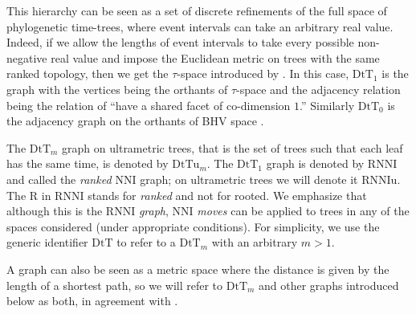 \documentclass[11pt]{amsart}
\theoremstyle{definition}
\newcommand{\nni}{\mathrm{NNI}}
\newcommand{\rnni}{\mathrm{RNNI}}
\newcommand{\rnniu}{\mathrm{RNNIu}}
\newcommand{\dtt}{\mathrm{DtT}}
\newcommand{\dttu}{\mathrm{DtTu}}
\begin{document}
This hierarchy can be seen as a set of discrete refinements of the full space of phylogenetic time-trees, where event intervals can take an arbitrary real value.
Indeed, if we allow the lengths of event intervals to take every possible non-negative real value and impose the Euclidean metric on trees with the same ranked topology, then we get the $\tau$-space introduced by \textcite{Gavryushkin2014-bw}.
In this case, $\dtt_1$ is the graph with the vertices being the orthants of $\tau$-space and the adjacency relation being the relation of ``have a shared facet of co-dimension $1$.''
Similarly $\dtt_0$ is the adjacency graph on the orthants of BHV space \autocite{Billera2001-rj}.

The $\dtt_m$ graph on ultrametric trees, that is the set of trees such that each leaf has the same time, is denoted by $\dttu_m$.
The $\dtt_1$ graph is denoted by $\rnni$ and called the \emph{ranked $\nni$} graph; on ultrametric trees we will denote it $\rnniu$.
The $\mathrm R$ in $\rnni$ stands for \emph{ranked} and not for rooted.
We emphasize that although this is the $\rnni$ \emph{graph}, $\nni$ \emph{moves} can be applied to trees in any of the spaces considered (under appropriate conditions).
For simplicity, we use the generic identifier $\dtt$ to refer to a $\dtt_m$ with an arbitrary $m > 1$.

A graph can also be seen as a metric space where the distance is given by the length of a shortest path, so we will refer to $\dtt_m$ and other graphs introduced below as both, in agreement with \autocite{Semple2003-nj}.
\end{document}
